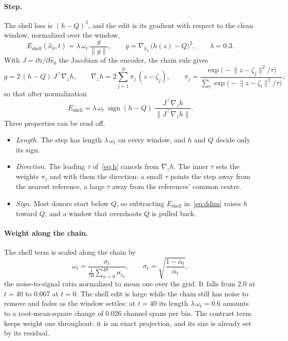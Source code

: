 \documentclass[11pt,a4paper]{article}
\newcommand{\xhat}{\hat{x}_{0}}            %
\newcommand{\abar}{\bar\alpha}
\newcommand{\Eshell}{E_{\mathrm{shell}}}
\newcommand{\norm}[1]{\lVert #1 \rVert}
\DeclareMathOperator{\sign}{sign}
\begin{document}
\paragraph{Step.}
The shell loss is $(h - Q)^{2}$, and the edit is its gradient with respect to
the clean window, normalized over the window,
\begin{equation}
\label{eq:shell}
\Eshell(\xhat, t)
  = \lambda\,\omega_{t}\,\frac{g}{\norm{g}},
\qquad
g = \nabla_{\xhat}\,\bigl(h(z) - Q\bigr)^{2},
\qquad
\lambda = 0.3 .
\end{equation}
With $J = \partial z / \partial \xhat$ the Jacobian of the encoder, the chain
rule gives
\begin{equation}
\label{eq:grad}
g = 2\,(h - Q)\,J^{\top}\nabla_{z} h,
\qquad
\nabla_{z} h = 2 \sum_{j=1}^{N} \pi_{j}\,(z - \zeta_{j}),
\qquad
\pi_{j} = \frac{\exp\bigl(-\norm{z - \zeta_{j}}^{2}/\tau\bigr)}
               {\sum_{l}\exp\bigl(-\norm{z - \zeta_{l}}^{2}/\tau\bigr)},
\end{equation}
so that after normalization
\begin{equation}
\label{eq:shellsign}
\Eshell
  = \lambda\,\omega_{t}\;\sign(h - Q)\;
    \frac{J^{\top}\nabla_{z}h}{\norm{J^{\top}\nabla_{z}h}} .
\end{equation}
Three properties can be read off.
\begin{itemize}
\setlength{\itemsep}{1pt}
\item \emph{Length.} The step has length $\lambda\,\omega_{t}$ on every
  window, and $h$ and $Q$ decide only its sign.
\item \emph{Direction.} The leading $\tau$ of~\eqref{eq:h} cancels from
  $\nabla_{z} h$. The inner $\tau$ sets the weights $\pi_{j}$ and with them
  the direction: a small $\tau$ points the step away from the nearest
  reference, a large $\tau$ away from the references' common centre.
\item \emph{Sign.} Most donors start below $Q$, so subtracting $\Eshell$
  in~\eqref{eq:ddim} raises $h$ toward $Q$, and a window that overshoots $Q$
  is pulled back.
\end{itemize}

\paragraph{Weight along the chain.}
The shell term is scaled along the chain by
\begin{equation}
\label{eq:omega}
\omega_{t}
  = \frac{\sigma_{t}}{\tfrac{1}{50}\sum_{n=0}^{49}\sigma_{t_{n}}},
\qquad
\sigma_{t} = \sqrt{\frac{1 - \abar_{t}}{\abar_{t}}},
\end{equation}
the noise-to-signal ratio normalized to mean one over the grid. It falls from
2.0 at $t = 40$ to 0.067 at $t = 0$. The shell edit is large while the chain
still has noise to remove and fades as the window settles: at $t = 40$ its
length $\lambda\,\omega_{t} = 0.6$ amounts to a root-mean-square change of
0.026 channel spans per bin. The contrast term keeps weight one throughout: it
is an exact projection, and its size is already set by its residual.
\end{document}

